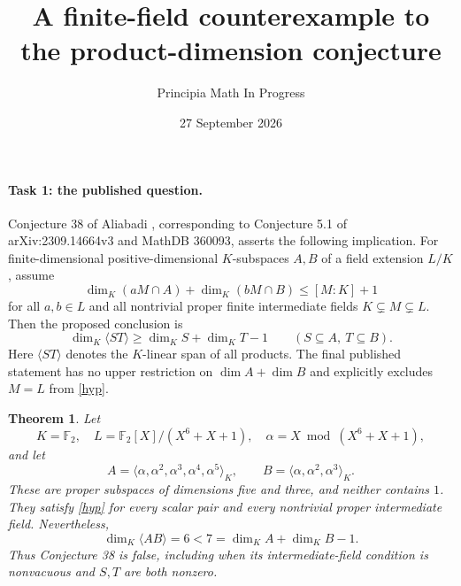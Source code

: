 \documentclass[11pt]{article}
\title{A finite-field counterexample to the product-dimension conjecture}
\author{Principia Math In Progress}
\date{27 September 2026}
\newtheorem{theorem}{Theorem}
\newcommand{\F}{\mathbb F}
\begin{document}
\maketitle

\paragraph{Task 1: the published question.}
Conjecture 38 of Aliabadi \cite{A}, corresponding to Conjecture 5.1 of
arXiv:2309.14664v3 and MathDB 360093, asserts the following implication.
For finite-dimensional positive-dimensional $K$-subspaces $A,B$ of a
field extension $L/K$, assume
\begin{equation}\label{hyp}
 \dim_K(aM\cap A)+\dim_K(bM\cap B)\le [M:K]+1
\end{equation}
for all $a,b\in L$ and all nontrivial proper finite intermediate fields
$K\subsetneq M\subsetneq L$. Then the proposed conclusion is
\begin{equation}\label{conclusion}
 \dim_K\langle ST\rangle\ge \dim_K S+\dim_K T-1
 \qquad(S\subseteq A,\ T\subseteq B).
\end{equation}
Here $\langle ST\rangle$ denotes the $K$-linear span of all products.
The final published statement has no upper restriction on
$\dim A+\dim B$ and explicitly excludes $M=L$ from \eqref{hyp}.

\begin{theorem}\label{main}
Let
\[
 K=\F_2,\quad L=\F_2[X]/(X^6+X+1),\quad \alpha=X\bmod(X^6+X+1),
\]
and let
\[
 A=\langle\alpha,\alpha^2,\alpha^3,\alpha^4,\alpha^5\rangle_K,
 \qquad B=\langle\alpha,\alpha^2,\alpha^3\rangle_K.
\]
These are proper subspaces of dimensions five and three, and neither
contains $1$. They satisfy \eqref{hyp} for every scalar pair and every
nontrivial proper intermediate field. Nevertheless,
\[
 \dim_K\langle AB\rangle=6<7=\dim_K A+\dim_K B-1.
\]
Thus Conjecture 38 is false, including when its intermediate-field
condition is nonvacuous and $S,T$ are both nonzero.
\end{theorem}
\end{document}
